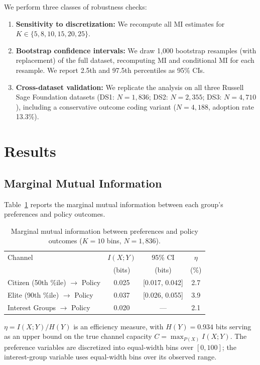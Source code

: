\documentclass[twocolumn,10pt]{article}
\begin{document}
We perform three classes of robustness checks:
\begin{enumerate}
\item \textbf{Sensitivity to discretization:} We recompute all MI estimates for $K \in \{5, 8, 10, 15, 20, 25\}$.
\item \textbf{Bootstrap confidence intervals:} We draw 1,000 bootstrap resamples (with replacement) of the full dataset, recomputing MI and conditional MI for each resample.  We report 2.5th and 97.5th percentiles as 95\% CIs.
\item \textbf{Cross-dataset validation:} We replicate the analysis on all three Russell Sage Foundation datasets (DS1: $N = 1{,}836$; DS2: $N = 2{,}355$; DS3: $N = 4{,}710$), including a conservative outcome coding variant ($N = 4{,}188$, adoption rate 13.3\%).
\end{enumerate}

\section{Results}
\label{sec:results}

\subsection{Marginal Mutual Information}

Table~\ref{tab:marginal} reports the marginal mutual information between each group's preferences and policy outcomes.

\begin{table}[t]
\centering
\caption{Marginal mutual information between preferences and policy outcomes ($K=10$ bins, $N=1{,}836$).}
\label{tab:marginal}
\begin{tabular}{@{}lccc@{}}
\toprule
Channel & $I(X;Y)$ & 95\% CI & $\eta$ \\
 & (bits) & (bits) & (\%) \\
\midrule
Citizen (50th \%ile) $\to$ Policy & 0.025 & [0.017, 0.042] & 2.7 \\
Elite (90th \%ile) $\to$ Policy & 0.037 & [0.026, 0.055] & 3.9 \\
Interest Groups $\to$ Policy & 0.020 & --- & 2.1 \\
\bottomrule
\end{tabular}
\smallskip

\footnotesize{$\eta = I(X;Y)/H(Y)$ is an efficiency measure, with $H(Y) = 0.934$ bits serving as an upper bound on the true channel capacity $C = \max_{P(X)} I(X;Y)$.  The preference variables are discretized into equal-width bins over $[0, 100]$; the interest-group variable uses equal-width bins over its observed range.}
\end{table}
\end{document}
